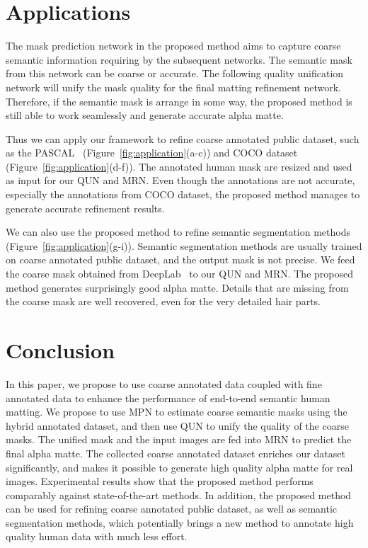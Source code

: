 \documentclass[10pt,twocolumn,letterpaper]{article}
\begin{document}
\section{Applications}
The mask prediction network in the proposed method aims to capture coarse semantic information requiring by the subsequent networks. The semantic mask from this network can be coarse or accurate. The following quality unification network will unify the mask quality for the final matting refinement network. Therefore, if the semantic mask is arrange in some way, the proposed method is still able to work seamlessly and generate accurate alpha matte.

Thus we can apply our framework to refine coarse annotated public dataset, such as the PASCAL~\cite{pascal-voc-2007} (Figure~\ref{fig:application}(a-c)) and COCO dataset~\cite{lin2014microsoft} (Figure~\ref{fig:application}(d-f)). The annotated human mask are resized and used as input for our QUN and MRN. Even though the annotations are not accurate, especially the annotations from COCO dataset, the proposed method manages to generate accurate refinement results.

We can also use the proposed method to refine semantic segmentation methods (Figure~\ref{fig:application}(g-i)). Semantic segmentation methods are usually trained on coarse annotated public dataset, and the output mask is not precise. We feed the coarse mask obtained from DeepLab~\cite{chen2017rethinking} to our QUN and MRN. The proposed method generates surprisingly good alpha matte. Details that are missing from the coarse mask are well recovered, even for the very detailed hair parts.



\section{Conclusion}
\label{sec: Conclusion}
In this paper, we propose to use coarse annotated data coupled with fine annotated data to enhance the performance of end-to-end semantic human matting. We propose to use MPN to estimate coarse semantic masks using the hybrid annotated dataset, and then use QUN to unify the quality of the coarse masks. The unified mask and the input images are fed into MRN to predict the final alpha matte. The collected coarse annotated dataset enriches our dataset significantly, and makes it possible to generate high quality alpha matte for real images. Experimental results show that the proposed method performs comparably against state-of-the-art methods. In addition, the proposed method can be used for refining coarse annotated public dataset, as well as semantic segmentation methods, which potentially brings a new method to annotate high quality human data with much less effort.
\clearpage

{\small


}
\end{document}
